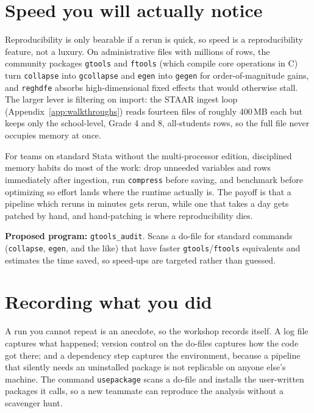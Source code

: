 \documentclass[
    a4paper,
    fontsize=10pt,
    twoside=true,
    numbers=noenddot,
]{kaobook}
\begin{document}
\section{Speed you will actually notice}
Reproducibility is only bearable if a rerun is quick, so speed is a reproducibility feature, not a luxury. On administrative files with millions of rows, the community packages \texttt{gtools} and \texttt{ftools} (which compile core operations in C) turn \texttt{collapse} into \texttt{gcollapse} and \texttt{egen} into \texttt{gegen} for order-of-magnitude gains, and \texttt{reghdfe} absorbs high-dimensional fixed effects that would otherwise stall. The larger lever is filtering on import: the STAAR ingest loop (Appendix~\ref{app:walkthroughs}) reads fourteen files of roughly 400\,MB each but keeps only the school-level, Grade 4 and 8, all-students rows, so the full file never occupies memory at once.

For teams on standard Stata without the multi-processor edition, disciplined memory habits do most of the work: drop unneeded variables and rows immediately after ingestion, run \texttt{compress} before saving, and benchmark before optimizing so effort lands where the runtime actually is. The payoff is that a pipeline which reruns in minutes gets rerun, while one that takes a day gets patched by hand, and hand-patching is where reproducibility dies.

\begin{kaobox}[frametitle=Ado-file Idea: \texttt{gtools\_audit}]
\textbf{Proposed program:} \texttt{gtools\_audit}. Scans a do-file for standard commands (\texttt{collapse}, \texttt{egen}, and the like) that have faster \texttt{gtools}/\texttt{ftools} equivalents and estimates the time saved, so speed-ups are targeted rather than guessed.
\end{kaobox}

\section{Recording what you did}
A run you cannot repeat is an anecdote, so the workshop records itself. A log file captures what happened; version control on the do-files captures how the code got there; and a dependency step captures the environment, because a pipeline that silently needs an uninstalled package is not replicable on anyone else's machine. The command \texttt{usepackage} scans a do-file and installs the user-written packages it calls, so a new teammate can reproduce the analysis without a scavenger hunt.
\end{document}
